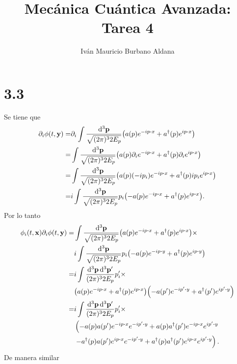 \documentclass{article}
\title{Mecánica Cuántica Avanzada: Tarea 4}
\author{Iván Mauricio Burbano Aldana}
\begin{document}
\maketitle

\section*{3.3}

Se tiene que
\begin{align}
\begin{split}
\partial_i\phi(t,\vb{y})=&\partial_i\int \frac{\dd[3]{\vb{p}}}{\sqrt{(2\pi)^32E_p}}\qty(a(p)e^{-ip\vdot x}+a^\dagger(p)e^{ip\vdot x})\\
=&\int \frac{\dd[3]{\vb{p}}}{\sqrt{(2\pi)^32E_p}}\qty(a(p)\partial_ie^{-ip\vdot x}+a^\dagger(p)\partial_ie^{ip\vdot x})\\
=&\int \frac{\dd[3]{\vb{p}}}{\sqrt{(2\pi)^32E_p}}\qty(a(p)(-ip_i)e^{-ip\vdot x}+a^\dagger(p)ip_ie^{ip\vdot x})\\
=&i\int \frac{\dd[3]{\vb{p}}}{\sqrt{(2\pi)^32E_p}}p_i\qty(-a(p)e^{-ip\vdot x}+a^\dagger(p)e^{ip\vdot x}).
\end{split}
\end{align}
Por lo tanto
\begin{align}
\begin{split}
\phi_i(t,\vb{x})\partial_i\phi(t,\vb{y})=&\int \frac{\dd[3]{\vb{p}}}{\sqrt{(2\pi)^32E_p}}\qty(a(p)e^{-ip\vdot x}+a^\dagger(p)e^{ip\vdot x})\times\\
&i\int \frac{\dd[3]{\vb{p}}}{\sqrt{(2\pi)^32E_p}}p_i\qty(-a(p)e^{-ip\vdot y}+a^\dagger(p)e^{ip\vdot y})\\
=&i\int\frac{\dd[3]{\vb{p}}\dd[3]{\vb{p'}}}{(2\pi)^32E_p}p_i'\times\\
&\qty(a(p)e^{-ip\vdot x}+a^\dagger(p)e^{ip\vdot x})
\qty(-a(p')e^{-ip'\vdot y}+a^\dagger(p')e^{ip'\vdot y})\\
=&i\int\frac{\dd[3]{\vb{p}}\dd[3]{\vb{p'}}}{(2\pi)^32E_p}p_i'\times\\
&\left(-a(p)a(p')e^{-ip\vdot x}e^{-ip'\vdot y}+a(p)a^\dagger(p')e^{-ip\vdot x}e^{ip'\vdot y}\right.\\
&\left.-a^\dagger(p)a(p')e^{ip\vdot x}e^{-ip'\vdot y}+a^\dagger(p)a^\dagger(p')e^{ip\vdot x}e^{ip'\vdot y}\right).
\end{split}
\end{align}
De manera similar
\end{document}
